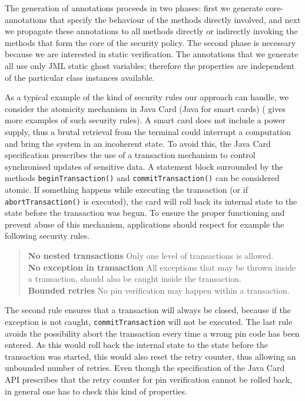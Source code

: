 The generation of annotations proceeds in two phases: first we
generate core-annotations that specify the behaviour of the methods
directly involved, and next we propagate these annotations to all
methods directly or indirectly invoking the methods that form the core
of the security policy. The second phase is necessary because we are
interested in static verification. The annotations that we generate
all use only JML static ghost variables; therefore the properties are
independent of the particular class instances available. 

As a typical example of the kind of security rules our approach can
handle, we consider the atomicity mechanism in Java Card (Java for
smart cards) (\cite{PavlovaBBHL04} gives more examples of such
security rules). A smart card does not include a power supply, thus a
brutal retrieval from the terminal could interrupt a computation and
bring the system in an incoherent state. To avoid this, the Java Card
specification prescribes the use of a transaction mechanism to control
synchronised updates of sensitive data. A statement block surrounded
by the methods \texttt{beginTransaction()} and
\texttt{commitTransaction()} can be considered atomic.
If something happens while executing the transaction (or if
\texttt{abortTransaction()} is executed), the card will
roll back its internal state to the state before the transaction was
begun. To ensure the proper functioning and prevent abuse of this
mechanism, applications should respect for example the following
security rules. 

\begin{quote}
\textbf{No nested transactions} Only one level of transactions
is allowed.\smallskip\\
\textbf{No exception in transaction} All exceptions that may be thrown
inside a transaction, should also be caught inside the
transaction.\smallskip\\
\textbf{Bounded retries}
No pin verification may happen within a transaction.
\end{quote} 
The second rule ensures that a transaction will always be closed,
because if the exception is not caught, \texttt{commitTransaction}
will not be executed. The last rule avoids the possibility abort the
transaction every time a wrong pin code has been entered. As this
would roll back the internal state to the state before the transaction was
started, this would also reset the retry counter, thus allowing an
unbounded number of retries. Even though the specification of the Java
Card API prescribes that the retry counter for pin verification cannot
be rolled back, in general one has to check this kind of properties.

